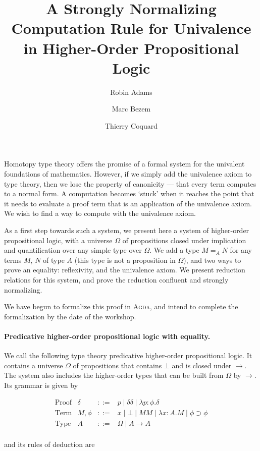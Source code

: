 \documentclass{easychair}
\title{A Strongly Normalizing Computation Rule for Univalence in Higher-Order Propositional Logic}
\author{Robin Adams\inst{1} \and Marc Bezem\inst{1} \and Thierry Coquard\inst{2}}
\institute{Universitetet i Bergen,
Bergen, Norway \\
\email{\{robin.adams,marc\}@uib.no}
\and
University of Gothenburg,
Gothenburg, Sweden \\
\email{coquand@chalmers.se}}
\begin{document}
\maketitle

Homotopy type theory offers the promise of a formal system for the univalent foundations of mathematics.  However, if
we simply add the univalence axiom to type theory, then we lose the property of canonicity --- that every term computes to
a normal form.  A computation becomes `stuck' when it reaches the point that it needs to evaluate a proof term
that is an application of the univalence axiom.  We wish to find a way to compute with the univalence axiom.

As a first step towards such a system, we present here a system of higher-order propositional logic,  with a universe $\Omega$ of propositions
closed under implication and quantification over any simple type over $\Omega$.  We add a type $M =_A N$ for any terms $M$, $N$ of type $A$
(this type is not a proposition in $\Omega$), and two ways to prove an equality: reflexivity, and the univalence axiom.  We present
reduction relations for this system, and prove the reduction confluent and strongly normalizing.

We have begun to formalize this proof in \textsc{Agda}, and intend to complete the formalization by the date of the workshop.

\paragraph{Predicative higher-order propositional logic with equality.}

We call the following type theory predicative higher-order propositional logic.  It contains a universe $\Omega$ of propositions that contains $\bot$ and
is closed under $\rightarrow$.  The system also includes the higher-order types that can be built from $\Omega$ by $\rightarrow$.  Its grammar is given by

\[ \begin{array}{lrcl}
\text{Proof} & \delta & ::= & p \mid \delta \delta \mid \lambda p : \phi . \delta \\
\text{Term} & M, \phi & ::= & x \mid \bot \mid M M \mid \lambda x : A . M \mid \phi \supset \phi \\
\text{Type} & A & ::= & \Omega \mid A \rightarrow A \\
\end{array} \]

and its rules of deduction are
\end{document}
